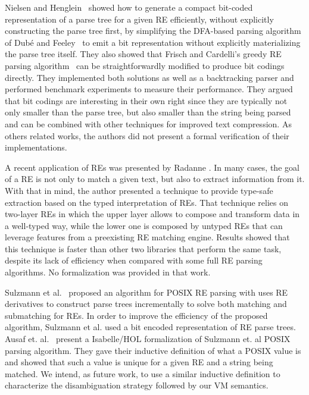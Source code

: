 \documentclass[oneside,12pt]{scrbook}
\theoremstyle{definition}
\theoremstyle{plain}
\theoremstyle{definition}
\begin{document}
Nielsen and Henglein~\cite{Lasse2011} showed how to generate a compact bit-coded representation of a parse tree for a given RE efficiently, without explicitly constructing the parse tree first, by simplifying the DFA-based parsing algorithm of Dubé and Feeley~\cite{Dube2000} to emit a bit representation without explicitly materializing the parse tree itself. They also showed that Frisch and Cardelli’s greedy RE parsing algorithm~\cite{Frisch2004} can be straightforwardly modified to produce bit codings directly. They implemented both solutions as well as a backtracking parser and performed benchmark experiments to measure their performance. They argued that bit codings are interesting in their own right since they are typically not only smaller than the parse tree, but also smaller than the string being parsed and can be combined with other techniques for improved text compression. As others related works, the authors did not present a formal verification of their implementations.


A recent application of REs was presented by Radanne \cite{Radanne2019}. In many cases, the goal of a RE is not only to match a given text, but also to extract information from it. With that in mind, the author presented a technique to provide type-safe extraction based on the typed interpretation of REs. That technique relies on two-layer REs in which the upper layer allows to compose and transform data in a well-typed way, while the lower one is composed by untyped REs that can leverage features from a preexisting RE matching engine. Results showed that this technique is faster than other two libraries that perform the same task, despite its lack of efficiency when compared with some full RE parsing algorithms. No formalization was provided in that work.

Sulzmann et al.~\cite{Sulzmann14} proposed an algorithm for POSIX RE parsing with uses RE derivatives to construct parse trees incrementally to solve both matching and submatching for REs. In order to improve the efficiency of the proposed algorithm, Sulzmann et al. used a bit encoded representation of RE parse trees. Ausaf et. al.~\cite{Ausaf16} present a Isabelle/HOL formalization of Sulzmann et. al POSIX parsing algorithm. They gave their inductive definition of what a POSIX value is and showed that such a value is unique for a given RE and a string being matched. We intend, as future work, to use a similar inductive definition to characterize the disambiguation strategy followed by our VM semantics. %
\end{document}
